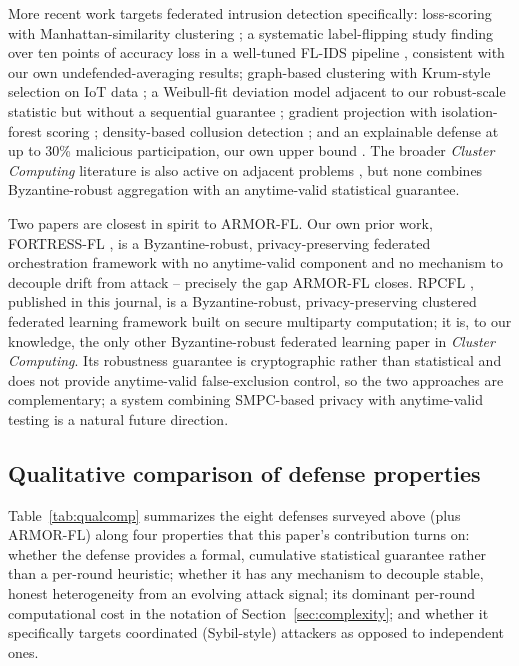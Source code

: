 \documentclass[pdflatex,iicol,sn-mathphys-num]{sn-jnl}%
\theoremstyle{thmstyleone}%
\theoremstyle{thmstyletwo}%
\theoremstyle{thmstylethree}%
\begin{document}
More recent work targets federated intrusion detection specifically: loss-scoring with Manhattan-similarity clustering \citep{yang2023dependable}; a systematic label-flipping study finding over ten points of accuracy loss in a well-tuned FL-IDS pipeline \citep{lavaur2025labelflip}, consistent with our own undefended-averaging results; graph-based clustering with Krum-style selection on IoT data \citep{rezaei2025grafids,rezaei2025rnn}; a Weibull-fit deviation model adjacent to our robust-scale statistic but without a sequential guarantee \citep{sameera2025weidetect}; gradient projection with isolation-forest scoring \citep{zukaib2026d3flids}; density-based collusion detection \citep{latif2026feddbc}; and an explainable defense at up to 30\% malicious participation, our own upper bound \citep{chowdhury2026flexids}. The broader \emph{Cluster Computing} literature is also active on adjacent problems \citep{akter2026fair,buyuktanir2025flidssurvey,mohawesh2026llmhfl,bella2026cpsfedids,godavarthi2026fedqlearning,houichi2026trustaware,ram2026blocshield}, but none combines Byzantine-robust aggregation with an anytime-valid statistical guarantee.

Two papers are closest in spirit to ARMOR-FL. Our own prior work, FORTRESS-FL \citep{dang2026fortressfl}, is a Byzantine-robust, privacy-preserving federated orchestration framework with no anytime-valid component and no mechanism to decouple drift from attack -- precisely the gap ARMOR-FL closes. RPCFL \citep{chen2026rpcfl}, published in this journal, is a Byzantine-robust, privacy-preserving clustered federated learning framework built on secure multiparty computation; it is, to our knowledge, the only other Byzantine-robust federated learning paper in \emph{Cluster Computing}. Its robustness guarantee is cryptographic rather than statistical and does not provide anytime-valid false-exclusion control, so the two approaches are complementary; a system combining SMPC-based privacy with anytime-valid testing is a natural future direction.

\subsection{Qualitative comparison of defense properties}\label{sec:qualcomp}

Table~\ref{tab:qualcomp} summarizes the eight defenses surveyed above (plus ARMOR-FL) along four properties that this paper's contribution turns on: whether the defense provides a formal, cumulative statistical guarantee rather than a per-round heuristic; whether it has any mechanism to decouple stable, honest heterogeneity from an evolving attack signal; its dominant per-round computational cost in the notation of Section~\ref{sec:complexity}; and whether it specifically targets coordinated (Sybil-style) attackers as opposed to independent ones.
\end{document}
